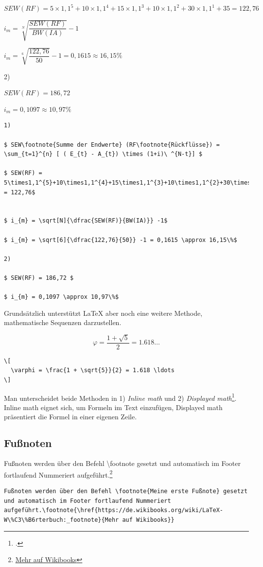 $ SEW(RF) = 5\times1,1^{5}+10\times1,1^{4}+15\times1,1^{3}+10\times1,1^{2}+30\times1,1^{1}+35 = 122,76$


$ i_{m} = \sqrt[N]{\dfrac{SEW(RF)}{BW(IA)}} -1$

$ i_{m} = \sqrt[6]{\dfrac{122,76}{50}} -1 = 0,1615 \approx 16,15\%$

2)

$ SEW(RF) = 186,72 $

$ i_{m} = 0,1097 \approx 10,97\%$
\begin{lstlisting}
1)

$ SEW\footnote{Summe der Endwerte} (RF\footnote{Rückflüsse}) = \sum_{t=1}^{n} [ ( E_{t} - A_{t}) \times (1+i)\ ^{N-t}] $

$ SEW(RF) = 5\times1,1^{5}+10\times1,1^{4}+15\times1,1^{3}+10\times1,1^{2}+30\times1,1^{1}+35 = 122,76$


$ i_{m} = \sqrt[N]{\dfrac{SEW(RF)}{BW(IA)}} -1$

$ i_{m} = \sqrt[6]{\dfrac{122,76}{50}} -1 = 0,1615 \approx 16,15\%$

2)

$ SEW(RF) = 186,72 $

$ i_{m} = 0,1097 \approx 10,97\%$
\end{lstlisting}

Grundsätzlich unterstützt \LaTeX{} aber noch eine weitere Methode, mathematische Sequenzen darzustellen.

\[
  \varphi = \frac{1 + \sqrt{5}}{2} = 1.618 \ldots
\]

\begin{lstlisting}
\[
  \varphi = \frac{1 + \sqrt{5}}{2} = 1.618 \ldots
\]
\end{lstlisting}
Man unterscheidet beide Methoden in 1) \emph{Inline math} und 2) \emph{Displayed math}\footcite[Vgl. ][S.276]{kottwitzLaTeXCookbook902015}. Inline math eignet sich, um Formeln im Text einzufügen, Displayed math präsentiert die Formel in einer eigenen Zeile.

\subsection{Fußnoten}
Fußnoten werden über den Befehl \textbackslash footnote gesetzt und automatisch im Footer fortlaufend Nummeriert aufgeführt.\footnote{\href{https://de.wikibooks.org/wiki/LaTeX-W\%C3\%B6rterbuch:_footnote}{Mehr auf Wikibooks}}
\begin{lstlisting}
Fußnoten werden über den Befehl \footnote{Meine erste Fußnote} gesetzt und automatisch im Footer fortlaufend Nummeriert aufgeführt.\footnote{\href{https://de.wikibooks.org/wiki/LaTeX-W\%C3\%B6rterbuch:_footnote}{Mehr auf Wikibooks}}
\end{lstlisting}

